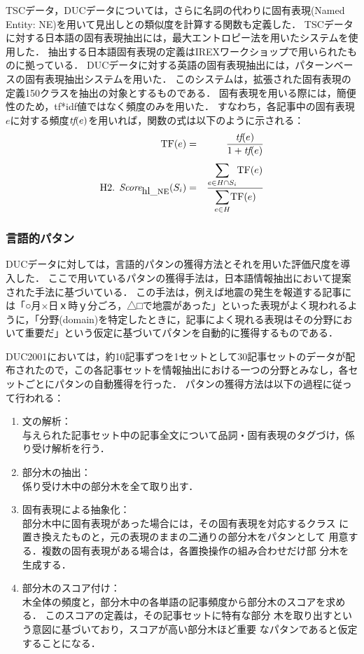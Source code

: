 TSCデータ，DUCデータについては，さらに名詞の代わりに固有表現(Named Entity: NE)を用いて見出しとの類似度を計算する関数も定義した．
TSCデータに対する日本語の固有表現抽出には，最大エントロピー法を用いたシステムを使用した\cite{uchimoto:acl2000}．
抽出する日本語固有表現の定義はIREXワークショップ\cite{IREX}で用いられたものに拠っている．
DUCデータに対する英語の固有表現抽出には，パターンベースの固有表現抽出システムを用いた．
このシステムは，拡張された固有表現の定義150クラスを抽出の対象とするものである\cite{sekine:lrec2002}．
固有表現を用いる際には，簡便性のため，tf*idf値ではなく頻度のみを用いた．
すなわち，各記事中の固有表現\(e\)に対する頻度\(\mbox {\it tf}(e)\)を用いれば，関数の式は以下のように示される： 
\begin{eqnarray*}
\mbox{TF}(e) & = & \frac{\mbox{\it tf}(e)}{1+\mbox{\it tf}(e)} \\[1mm]
\mbox{H2.  } 
\mbox{\it Score}_{\mbox{hl\_{\sc ne}}}(S_i)  & = &
\frac{\displaystyle{\sum_{e \in H \cap S_i}} \mbox{TF}(e)}
{\displaystyle{\sum_{e \in H}} \mbox{TF}(e)}
\end{eqnarray*}

\subsubsection{言語的パタン}

DUCデータに対しては，言語的パタンの獲得方法とそれを用いた評価尺度を導入した．
ここで用いているパタンの獲得手法は，日本語情報抽出において提案された手法に基づいている\cite{sudo:hlt2001}．
この手法は，例えば地震の発生を報道する記事には「○月×日ｘ時ｙ分ごろ，△□で地震があった」といった表現がよく現われるように，「分野(domain)を特定したときに，記事によく現れる表現はその分野において重要だ」という仮定に基づいてパタンを自動的に獲得するものである．

DUC2001においては，約10記事ずつを1セットとして30記事セットのデータが配布されたので，この各記事セットを情報抽出における一つの分野とみなし，各セットごとにパタンの自動獲得を行った．
パタンの獲得方法は以下の過程に従って行われる：
\begin{enumerate}
 \item 文の解析： \\
	   与えられた記事セット中の記事全文について品詞・固有表現のタグづけ，係り受け解析を行う．
 \item 部分木の抽出： \\
	   係り受け木中の部分木を全て取り出す．
 \item 固有表現による抽象化： \\ 
	   部分木中に固有表現があった場合には，その固有表現を対応するクラス
	   に置き換えたものと，元の表現のままの二通りの部分木をパタンとして
	   用意する．複数の固有表現がある場合は，各置換操作の組み合わせだけ部
	   分木を生成する．
 \item 部分木のスコア付け： \\ 
	   木全体の頻度と，部分木中の各単語の記事頻度から部分木のスコアを求める．
	   このスコアの定義は，その記事セットに特有な部分
	   木を取り出すという意図に基づいており，スコアが高い部分木ほど重要
	   なパタンであると仮定することになる．
\end{enumerate}

